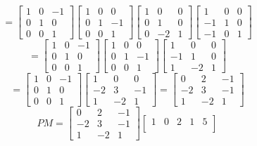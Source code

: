 \begin{itemize}
\begin{itemize}
$$= \begin{bmatrix}
1 & 0 & -1 \\
0 & 1 & 0 \\
0 & 0 & 1
\end{bmatrix}\begin{bmatrix}
1 & 0 & 0 \\
0 & 1 & -1 \\
0 & 0 & 1
\end{bmatrix}\begin{bmatrix}
1 & 0 & 0 \\
0 & 1 & 0 \\
0 & -2 & 1
\end{bmatrix}\begin{bmatrix}
1 & 0 & 0 \\
-1 & 1 & 0 \\
-1 & 0 & 1
\end{bmatrix}$$
$$= \begin{bmatrix}
1 & 0 & -1 \\
0 & 1 & 0 \\
0 & 0 & 1
\end{bmatrix}\begin{bmatrix}
1 & 0 & 0 \\
0 & 1 & -1 \\
0 & 0 & 1
\end{bmatrix}\begin{bmatrix}
1 & 0 & 0 \\
-1 & 1 & 0 \\
1 & -2 & 1
\end{bmatrix}$$
$$= \begin{bmatrix}
1 & 0 & -1 \\
0 & 1 & 0 \\
0 & 0 & 1
\end{bmatrix}\begin{bmatrix}
1 & 0 & 0 \\
-2 & 3 & -1 \\
1 & -2 & 1
\end{bmatrix} = \begin{bmatrix}
0 & 2 & -1 \\
-2 & 3 & -1 \\
1 & -2 & 1
\end{bmatrix}$$
$$PM = \begin{bmatrix}
0 & 2 & -1 \\
-2 & 3 & -1 \\
1 & -2 & 1
\end{bmatrix}\begin{bmatrix}
1 & 0 & 2 & 1 & 5 \\

\end{bmatrix}$$
\end{itemize}
\end{itemize}

